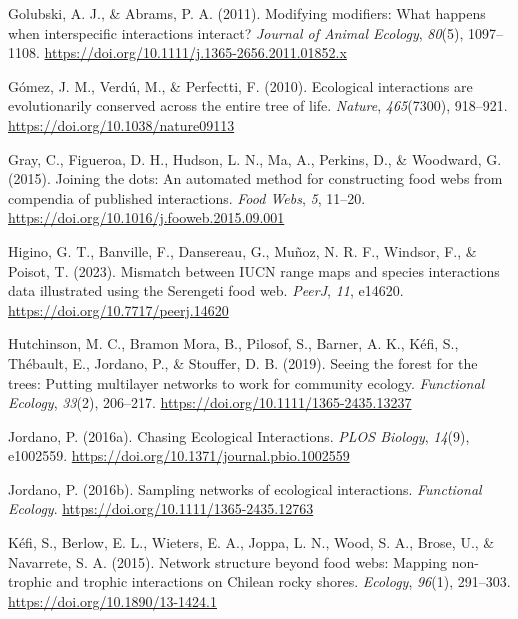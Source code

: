 \documentclass[
]{article}
\newlength{\cslhangindent}
\newenvironment{CSLReferences}[2] %
 {\begin{list}{}{%
  \setlength{\itemindent}{0pt}
  \setlength{\leftmargin}{0pt}
  \setlength{\parsep}{0pt}
  \ifodd #1
   \setlength{\leftmargin}{\cslhangindent}
   \setlength{\itemindent}{-1\cslhangindent}
  \fi
  \setlength{\itemsep}{#2\baselineskip}}}
 {\end{list}}
\begin{document}
\begin{CSLReferences}{1}{0}
Golubski, A. J., \& Abrams, P. A. (2011). Modifying modifiers: What
happens when interspecific interactions interact? \emph{Journal of
Animal Ecology}, \emph{80}(5), 1097--1108.
\url{https://doi.org/10.1111/j.1365-2656.2011.01852.x}

Gómez, J. M., Verdú, M., \& Perfectti, F. (2010). Ecological
interactions are evolutionarily conserved across the entire tree of
life. \emph{Nature}, \emph{465}(7300), 918--921.
\url{https://doi.org/10.1038/nature09113}

Gray, C., Figueroa, D. H., Hudson, L. N., Ma, A., Perkins, D., \&
Woodward, G. (2015). Joining the dots: {An} automated method for
constructing food webs from compendia of published interactions.
\emph{Food Webs}, \emph{5}, 11--20.
\url{https://doi.org/10.1016/j.fooweb.2015.09.001}

Higino, G. T., Banville, F., Dansereau, G., Muñoz, N. R. F., Windsor,
F., \& Poisot, T. (2023). Mismatch between {IUCN} range maps and species
interactions data illustrated using the {Serengeti} food web.
\emph{PeerJ}, \emph{11}, e14620.
\url{https://doi.org/10.7717/peerj.14620}

Hutchinson, M. C., Bramon Mora, B., Pilosof, S., Barner, A. K., Kéfi,
S., Thébault, E., Jordano, P., \& Stouffer, D. B. (2019). Seeing the
forest for the trees: {Putting} multilayer networks to work for
community ecology. \emph{Functional Ecology}, \emph{33}(2), 206--217.
\url{https://doi.org/10.1111/1365-2435.13237}

Jordano, P. (2016a). Chasing {Ecological Interactions}. \emph{PLOS
Biology}, \emph{14}(9), e1002559.
\url{https://doi.org/10.1371/journal.pbio.1002559}

Jordano, P. (2016b). Sampling networks of ecological interactions.
\emph{Functional Ecology}. \url{https://doi.org/10.1111/1365-2435.12763}

Kéfi, S., Berlow, E. L., Wieters, E. A., Joppa, L. N., Wood, S. A.,
Brose, U., \& Navarrete, S. A. (2015). Network structure beyond food
webs: Mapping non-trophic and trophic interactions on {Chilean} rocky
shores. \emph{Ecology}, \emph{96}(1), 291--303.
\url{https://doi.org/10.1890/13-1424.1}


\end{CSLReferences}
\end{document}
